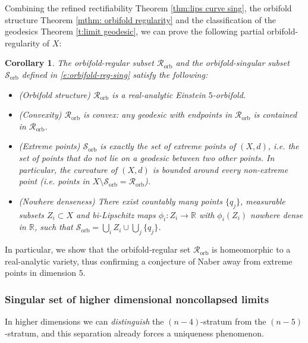 \documentclass[11pt,reqno]{amsart}
\numberwithin{equation}{section}
\newcommand{\RR}{\mathds{R}}
\newcommand{\cR}{\mathcal{R}}
\newcommand{\cS}{\mathcal{S}}
\newtheorem{corollary}[thm]{Corollary}
\theoremstyle{definition}
\theoremstyle{remark}
\begin{document}
Combining the refined rectifiability Theorem \ref{thm:lips curve sing}, the orbifold structure Theorem \ref{mthm: orbifold regularity} and the classification of the geodesics Theorem \ref{t:limit geodesic}, we can prove the following partial orbifold-regularity of $X$:
\begin{corollary}
The orbifold-regular subset $\cR_{\mathrm{orb}}$ and the orbifold-singular subset $\cS_{\mathrm{orb}}$ defined in \eqref{e:orbifold-reg-sing} satisfy the following:
\begin{itemize}
    \item \emph{(Orbifold structure) } $\cR_{\mathrm{orb}}$ is a real-analytic Einstein $5$-orbifold. 
    \item \emph{(Convexity) } $\cR_{\mathrm{orb}}$ is convex: any geodesic with endpoints in $\mathcal{R}_{\mathrm{orb}}$ is contained in $\mathcal{R}_{\mathrm{orb}}$.
    \item \emph{(Extreme points) } $\cS_{\mathrm{orb}}$ is exactly the set of \emph{extreme points of $(X,d)$}, i.e. the set of points that do not lie on a geodesic between two other points. In particular, the curvature of $(X,d)$ is bounded around every non-extreme point (i.e. points in $X\setminus\cS_{\mathrm{orb}}=\mathcal{R}_{\mathrm{orb}}$).
    \item \emph{(Nowhere denseness) } There exist countably many points $\{q_j \}$, measurable subsets $Z_i \subset X$ and bi-Lipschitz maps $\phi_i:Z_i \to \RR$ with $\phi_i(Z_i)$ \emph{nowhere dense} in $\RR$, such that $\cS_{\mathrm{orb}} = \bigcup_i Z_i \cup \bigcup_j\{q_j\}$. 
\end{itemize}
\end{corollary}

In particular, we show that the orbifold-regular set $\cR_{\mathrm{orb}}$ is homeomorphic to a real-analytic variety, thus confirming a conjecture of Naber \cite[Conjecture 6.4]{nab14} away from extreme points in dimension $5$.









\subsubsection{Singular set of higher dimensional noncollapsed limits}

In higher dimensions we can
\emph{distinguish} the $(n-4)$-stratum from the $(n-5)$-stratum, and this separation already
forces a uniqueness phenomenon.
\end{document}
